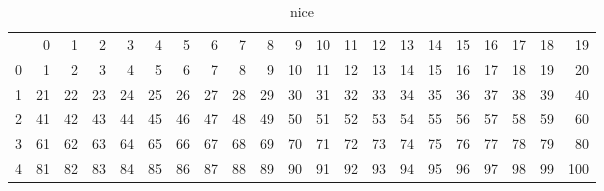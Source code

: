\begin{table}
\caption{nice}
\label{TestTable1}
\begin{tabular}{lrrrrrrrrrrrrrrrrrrrr}
 & 0 & 1 & 2 & 3 & 4 & 5 & 6 & 7 & 8 & 9 & 10 & 11 & 12 & 13 & 14 & 15 & 16 & 17 & 18 & 19 \\
0 & 1 & 2 & 3 & 4 & 5 & 6 & 7 & 8 & 9 & 10 & 11 & 12 & 13 & 14 & 15 & 16 & 17 & 18 & 19 & 20 \\
1 & 21 & 22 & 23 & 24 & 25 & 26 & 27 & 28 & 29 & 30 & 31 & 32 & 33 & 34 & 35 & 36 & 37 & 38 & 39 & 40 \\
2 & 41 & 42 & 43 & 44 & 45 & 46 & 47 & 48 & 49 & 50 & 51 & 52 & 53 & 54 & 55 & 56 & 57 & 58 & 59 & 60 \\
3 & 61 & 62 & 63 & 64 & 65 & 66 & 67 & 68 & 69 & 70 & 71 & 72 & 73 & 74 & 75 & 76 & 77 & 78 & 79 & 80 \\
4 & 81 & 82 & 83 & 84 & 85 & 86 & 87 & 88 & 89 & 90 & 91 & 92 & 93 & 94 & 95 & 96 & 97 & 98 & 99 & 100 \\
\end{tabular}
\end{table}
